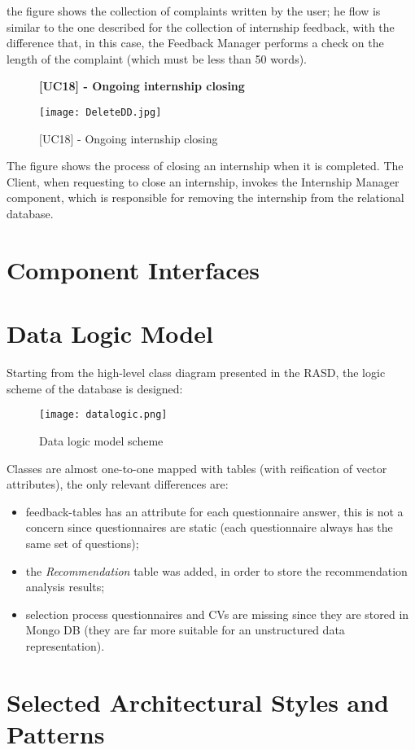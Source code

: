 		the figure shows the collection of complaints written by the user; he flow is similar to the one described for the collection of internship feedback, with the difference that, in this case, the Feedback Manager performs a check on the length of the complaint (which must be less than 50 words).
		
		
		\begin{figure}[H]
			\centering
			{\bfseries [UC18] - Ongoing internship closing}
			\caption{[UC18] - Ongoing internship closing}
			\texttt{[image: DeleteDD.jpg]}
			
		\end{figure}
		
		
		The figure shows the process of closing an internship when it is completed. The Client, when requesting to close an internship, invokes the Internship Manager component, which is responsible for removing the internship from the relational database.
		
		
		
		
	\section{Component Interfaces}
	\section{Data Logic Model}
		Starting from the high-level class diagram presented in the RASD, the logic scheme of the database is designed:
		\begin{figure}[H]
			\centering
			\texttt{[image: datalogic.png]}
			\caption{Data logic model scheme}
		\end{figure}
		Classes are almost one-to-one mapped with tables (with reification of vector attributes), the only relevant differences are:
		\begin{itemize}
			\item feedback-tables has an attribute for each questionnaire answer, this is not a concern since questionnaires are static (each questionnaire always has the same set of questions);
			\item the \emph{Recommendation} table was added, in order to store the recommendation analysis results;
			\item selection process questionnaires and CVs are missing since they are stored in Mongo DB (they are far more suitable for an unstructured data representation).
		\end{itemize}
	\section{Selected Architectural Styles and Patterns}
